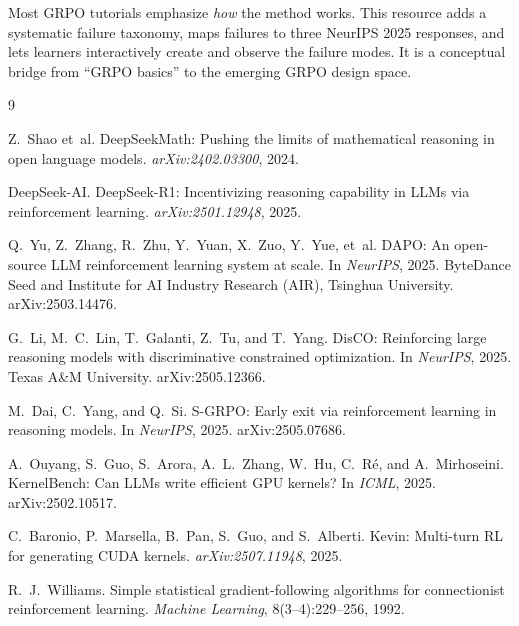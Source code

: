 \documentclass{article}
\begin{document}
Most GRPO tutorials emphasize \emph{how} the method works. This resource adds a systematic failure taxonomy, maps failures to three NeurIPS 2025 responses, and lets learners interactively create and observe the failure modes. It is a conceptual bridge from ``GRPO basics'' to the emerging GRPO design space.


\begin{thebibliography}{9}

Z.~Shao et~al.
\newblock DeepSeekMath: Pushing the limits of mathematical reasoning in open language models.
\newblock \emph{arXiv:2402.03300}, 2024.

DeepSeek-AI.
\newblock DeepSeek-R1: Incentivizing reasoning capability in LLMs via reinforcement learning.
\newblock \emph{arXiv:2501.12948}, 2025.

Q.~Yu, Z.~Zhang, R.~Zhu, Y.~Yuan, X.~Zuo, Y.~Yue, et~al.
\newblock DAPO: An open-source LLM reinforcement learning system at scale.
\newblock In \emph{NeurIPS}, 2025.
\newblock ByteDance Seed and Institute for AI Industry Research (AIR), Tsinghua University. arXiv:2503.14476.

G.~Li, M.~C.~Lin, T.~Galanti, Z.~Tu, and T.~Yang.
\newblock DisCO: Reinforcing large reasoning models with discriminative constrained optimization.
\newblock In \emph{NeurIPS}, 2025.
\newblock Texas A\&M University. arXiv:2505.12366.

M.~Dai, C.~Yang, and Q.~Si.
\newblock S-GRPO: Early exit via reinforcement learning in reasoning models.
\newblock In \emph{NeurIPS}, 2025.
\newblock arXiv:2505.07686.

A.~Ouyang, S.~Guo, S.~Arora, A.~L.~Zhang, W.~Hu, C.~R\'e, and A.~Mirhoseini.
\newblock KernelBench: Can LLMs write efficient GPU kernels?
\newblock In \emph{ICML}, 2025.
\newblock arXiv:2502.10517.

C.~Baronio, P.~Marsella, B.~Pan, S.~Guo, and S.~Alberti.
\newblock Kevin: Multi-turn RL for generating CUDA kernels.
\newblock \emph{arXiv:2507.11948}, 2025.

R.~J.~Williams.
\newblock Simple statistical gradient-following algorithms for connectionist reinforcement learning.
\newblock \emph{Machine Learning}, 8(3--4):229--256, 1992.


\end{thebibliography}
\end{document}
